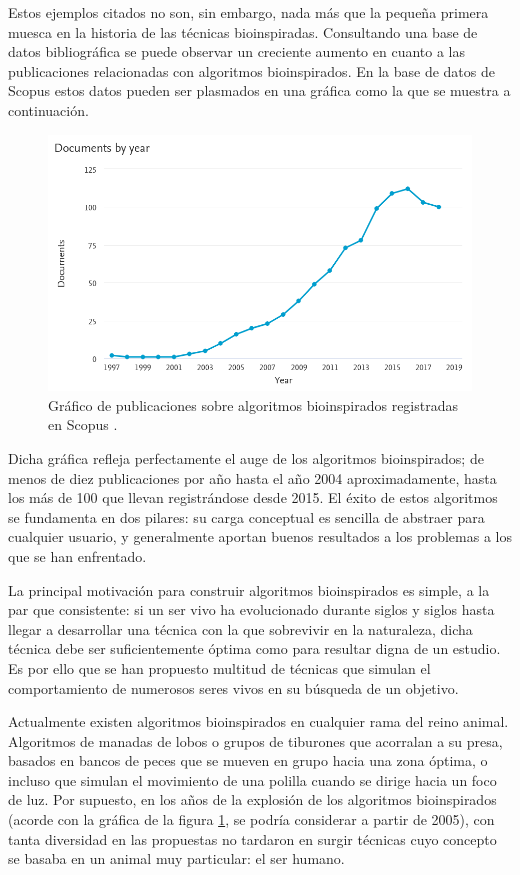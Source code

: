 Estos ejemplos citados no son, sin embargo, nada más que la pequeña primera muesca en la historia de las técnicas bioinspiradas. Consultando una base de datos bibliográfica se puede observar un creciente aumento en cuanto a las publicaciones relacionadas con algoritmos bioinspirados. En la base de datos de Scopus estos datos pueden ser plasmados en una gráfica como la que se muestra a continuación.

\begin{figure}[h]
	\centering
	\includegraphics[scale=0.4]{imagenes/scopus-grafico-bioinspirados.png}
	\caption{Gráfico de publicaciones sobre algoritmos bioinspirados registradas en Scopus \cite{scopus-bioinspired}.}
	\label{grafica-scopus}
\end{figure}

Dicha gráfica refleja perfectamente el auge de los algoritmos bioinspirados; de menos de diez publicaciones por año hasta el año 2004 aproximadamente, hasta los más de 100 que llevan registrándose desde 2015. El éxito de estos algoritmos se fundamenta en dos pilares: su carga conceptual es sencilla de abstraer para cualquier usuario, y generalmente aportan buenos resultados a los problemas a los que se han enfrentado.

La principal motivación para construir algoritmos bioinspirados es simple, a la par que consistente: si un ser vivo ha evolucionado durante siglos y siglos hasta llegar a desarrollar una técnica con la que sobrevivir en la naturaleza, dicha técnica debe ser suficientemente óptima como para resultar digna de un estudio. Es por ello que se han propuesto multitud de técnicas que simulan el comportamiento de numerosos seres vivos en su búsqueda de un objetivo.

Actualmente existen algoritmos bioinspirados en cualquier rama del reino animal. Algoritmos de manadas de lobos o grupos de tiburones que acorralan a su presa, basados en bancos de peces que se mueven en grupo hacia una zona óptima, o incluso que simulan el movimiento de una polilla cuando se dirige hacia un foco de luz. Por supuesto, en los años de la explosión de los algoritmos bioinspirados (acorde con la gráfica de la figura \ref{grafica-scopus}, se podría considerar a partir de 2005), con tanta diversidad en las propuestas no tardaron en surgir técnicas cuyo concepto se basaba en un animal muy particular: el ser humano.


